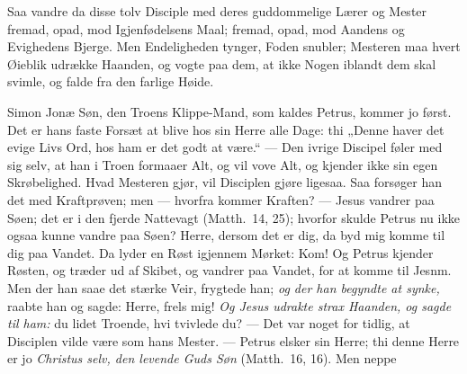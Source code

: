 \documentclass[12pt,a4paper]{book}
\begin{document}
Saa vandre da disse tolv Disciple med deres guddommelige Lærer og Mester fremad, opad, mod
Igjenfødelsens Maal; fremad, opad, mod Aandens og Evighedens Bjerge. Men Endeligheden
tynger, Foden snubler; Mesteren maa hvert Øieblik udrække Haanden, og vogte paa dem, at
ikke Nogen iblandt dem skal svimle, og falde fra den farlige Høide.

Simon Jonæ Søn, den Troens Klippe-Mand, som kaldes Petrus, kommer jo først. Det er hans
faste Forsæt at blive hos sin Herre alle Dage: thi „Denne haver det evige Livs Ord, hos ham
er det godt at være.“ --- Den ivrige Discipel føler med sig selv, at han i Troen formaaer
Alt, og vil vove Alt, og kjender ikke sin egen Skrøbelighed. Hvad Mesteren gjør, vil
Disciplen gjøre ligesaa. Saa forsøger han det med Kraftprøven; men --- hvorfra kommer
Kraften? --- Jesus vandrer paa Søen; det er i den fjerde Nattevagt (Matth.\ 14, 25);
hvorfor skulde Petrus nu ikke ogsaa kunne vandre paa Søen? {\large Herre, dersom det er
dig, da byd mig komme til dig paa Vandet.} Da lyder en Røst igjennem Mørket: {\large Kom!}
Og Petrus kjender Røsten, og træder ud af Skibet, og vandrer paa Vandet, for at komme til
Jesnm. {\large Men der han saae det stærke Veir, frygtede han;} \emph{og der han begyndte
at synke,} raabte han og sagde: {\large Herre, frels mig!}
\emph{Og Jesus udrakte strax Haanden, og sagde til ham:} {\large du lidet Troende, hvi
tvivlede du?} --- Det var noget for tidlig, at Disciplen vilde være som hans Mester. ---
Petrus elsker sin Herre; thi denne Herre er jo \emph{Christus selv, den levende Guds Søn}
(Matth.\ 16, 16). Men neppe
\end{document}
